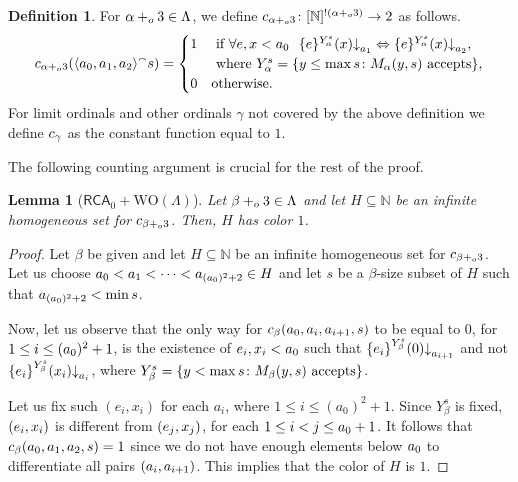 \documentclass[11pt]{amsart}
\newtheorem{lemma}[thm]{Lemma}
\theoremstyle{definition}
\newtheorem{definition}[thm]{Definition}
\theoremstyle{remark}
\theoremstyle{plain}
\newcommand{\numberset}{\mathbb}
\newcommand{\N}{\numberset{N}}
\def\conc{{}^\smallfrown}
\newcommand{\RCA}{\mathsf{RCA}_0}
\newcommand{\set}[1]{{\{{#1}\}}}
\def\stops{{\downarrow}}
\def\WO{{\textrm{WO}}}
\newcommand{\pluso}{+\sb{o}}
\def\N{{\mathbb{N}}}
\def\stops{{\downarrow}}
\newcommand{\isfunc}[3]{{{#1}\colon{#2}\rightarrow{#3}}}
\begin{document}
\begin{definition}\label{def:colorings}
For $\alpha \pluso 3\in\Lambda$, we define $\isfunc{c\sb{\alpha \pluso 3}}{[\N]\sp{!(\alpha\pluso3)}}2$ as follows.
$$
c\sb{\alpha \pluso 3}(\langle a_0,a_1,a\sb2 \rangle \conc s)=
\begin{cases}
1 & \mbox{ if } \forall e,x<a_0\ \  \{e\}^{ Y_\alpha^s}(x)\stops_{a_1} \Leftrightarrow \{e\}^{ Y_\alpha^s}(x)\stops_{a\sb 2},\\ 
& \mbox{ where } Y_\alpha^s=\{y\leq \max s\colon M_{\alpha}(y,s)\mbox{ accepts}\},\\
0 &  \mbox{otherwise.}
\end{cases}
$$
For limit ordinals and other ordinals $\gamma$ not covered by the above definition we define $c\sb\gamma$ as the constant function equal to $1$.
\end{definition}

The following counting argument is crucial for the rest of the proof.

\begin{lemma}[$\RCA+\WO(\Lambda)$]\label{lem:colored:one}
Let $\beta \pluso 3\in\Lambda$ and let $H\subseteq \N$ be an infinite homogeneous set for $c\sb{\beta \pluso  3}$. 
Then, $H$ has color $1$.
\end{lemma}

\begin{proof}
Let $\beta$ be given and let $H\subseteq\N$ be an infinite homogeneous set for $c\sb{\beta\pluso3}$.
Let us choose $a\sb0 < a\sb1 < \dots < a\sb{(a\sb0)\sp2+2}\in H$ and let $s$ be a $\beta$-size subset of $H$ such that $a\sb{(a\sb0)^2+2}<\min s$. 

Now, let us observe that the only way for $c\sb\beta(a\sb0, a\sb i, a\sb {i+1}, s)$ to be equal to $0$, for $1\leq i\leq (a\sb0)\sp2+1$, is the existence of $e\sb i,x\sb i<a\sb0$ such that $\set{e\sb i}\sp {Y_\beta^s}(0)\stops \sb{a\sb {i+1}}$ and not $\set{e\sb i}\sp {Y_\beta^s}(x\sb i)\stops\sb{a\sb i}$, where $Y_\beta^s=\set{y<\max s \colon M\sb{\beta}(y,s) \mbox{ accepts}}$.

Let us fix such $(e_i,x_i)$ for each $a_i$, where $1\leq i\leq (a_0)^2+1$.
Since $Y_\beta^s$ is fixed, $(e\sb i,x\sb i)$ is different from $(e\sb j,x\sb j)$, for each $1\leq i<j\leq a\sb0+1$. 
It follows that $c\sb\beta(a\sb0,a\sb1,a\sb 2,s)=1$ since we do not have enough elements below $a\sb 0$ to differentiate all pairs $(a\sb i, a\sb{i+1})$. 
This implies that the color of $H$ is $1$.
\end{proof}
\end{document}
